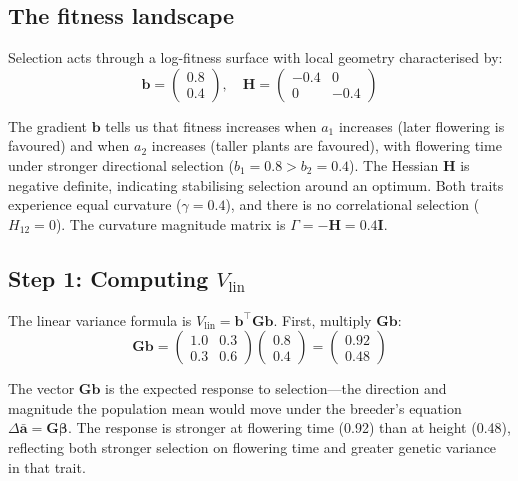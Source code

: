 \documentclass[9pt,twocolumn,twoside,lineno]{gsajnl}
\newcommand{\vect}[1]{\boldsymbol{#1}}
\newcommand{\mat}[1]{\mathbf{#1}}
\newcommand{\Vlin}{\ensuremath{V_{\text{lin}}}\xspace}
\begin{document}
\subsection{The fitness landscape}

Selection acts through a log-fitness surface with local geometry characterised by:
\begin{equation}
\vect{b} = \begin{pmatrix} 0.8 \\ 0.4 \end{pmatrix}, \quad \mat{H} = \begin{pmatrix} -0.4 & 0 \\ 0 & -0.4 \end{pmatrix}
\end{equation}

The gradient $\vect{b}$ tells us that fitness increases when $a_1$ increases (later flowering is favoured) and when $a_2$ increases (taller plants are favoured), with flowering time under stronger directional selection ($b_1 = 0.8 > b_2 = 0.4$). The Hessian $\mat{H}$ is negative definite, indicating stabilising selection around an optimum. Both traits experience equal curvature ($\gamma = 0.4$), and there is no correlational selection ($H_{12} = 0$). The curvature magnitude matrix is $\Gamma = -\mat{H} = 0.4\mat{I}$.

\subsection{Step 1: Computing $\Vlin$}

The linear variance formula is $\Vlin = \vect{b}^\top \mat{G} \vect{b}$. First, multiply $\mat{G}\vect{b}$:
\begin{equation}
\mat{G}\vect{b} = \begin{pmatrix} 1.0 & 0.3 \\ 0.3 & 0.6 \end{pmatrix} \begin{pmatrix} 0.8 \\ 0.4 \end{pmatrix} = \begin{pmatrix} 0.92 \\ 0.48 \end{pmatrix}
\end{equation}

The vector $\mat{G}\vect{b}$ is the expected response to selection---the direction and magnitude the population mean would move under the breeder's equation $\Delta\bar{\vect{a}} = \mat{G}\vect{\beta}$. The response is stronger at flowering time (0.92) than at height (0.48), reflecting both stronger selection on flowering time and greater genetic variance in that trait.
\end{document}
